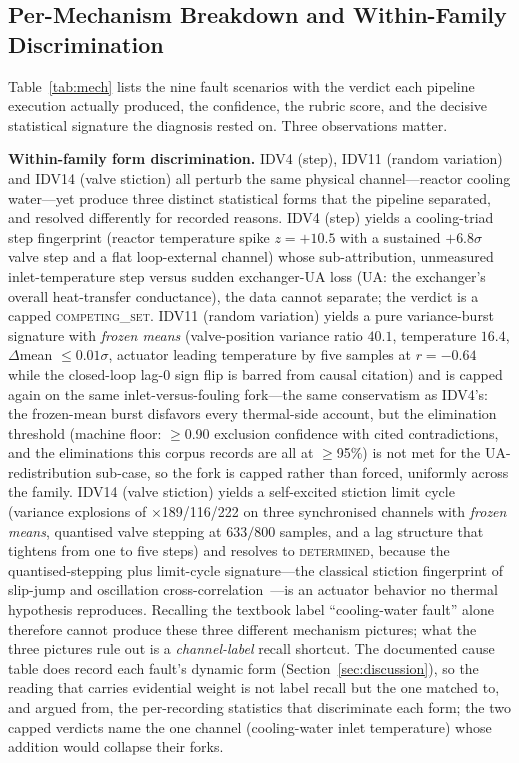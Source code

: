 \documentclass[preprint,10pt]{elsarticle}
\begin{document}
\subsection{Per-Mechanism Breakdown and Within-Family Discrimination}
\label{sec:permech}
Table~\ref{tab:mech} lists the nine fault scenarios with the verdict each pipeline execution actually produced, the confidence, the rubric score, and the decisive statistical signature the diagnosis rested on. Three observations matter.

\textbf{Within-family form discrimination.} IDV4 (step), IDV11 (random variation) and IDV14 (valve stiction) all perturb the same physical channel---reactor cooling water---yet produce three distinct statistical forms that the pipeline separated, and resolved differently for recorded reasons. IDV4 (step) yields a cooling-triad step fingerprint (reactor temperature spike $z{=}{+}10.5$ with a sustained $+6.8\sigma$ valve step and a flat loop-external channel) whose sub-attribution, unmeasured inlet-temperature step versus sudden exchanger-UA loss (UA: the exchanger's overall heat-transfer conductance), the data cannot separate; the verdict is a capped \mbox{\textsc{competing\_set}}. IDV11 (random variation) yields a pure variance-burst signature with \emph{frozen means} (valve-position variance ratio $40.1$, temperature $16.4$, $\Delta$mean $\le 0.01\sigma$, actuator leading temperature by five samples at $r{=}{-}0.64$ while the closed-loop lag-0 sign flip is barred from causal citation) and is capped again on the same inlet-versus-fouling fork---the same conservatism as IDV4's: the frozen-mean burst disfavors every thermal-side account, but the elimination threshold (machine floor: $\ge$0.90 exclusion confidence with cited contradictions, and the eliminations this corpus records are all at $\ge$95\%) is not met for the UA-redistribution sub-case, so the fork is capped rather than forced, uniformly across the family. IDV14 (valve stiction) yields a self-excited stiction limit cycle (variance explosions of $\times$189/116/222 on three synchronised channels with \emph{frozen means}, quantised valve stepping at $633/800$ samples, and a lag structure that tightens from one to five steps) and resolves to \mbox{\textsc{determined}}, because the quantised-stepping plus limit-cycle signature---the classical stiction fingerprint of slip-jump and oscillation cross-correlation~\cite{horch1999simple,hagglund1995control,choudhury2008diagnosis}---is an actuator behavior no thermal hypothesis reproduces. Recalling the textbook label ``cooling-water fault'' alone therefore cannot produce these three different mechanism pictures; what the three pictures rule out is a \emph{channel-label} recall shortcut. The documented cause table does record each fault's dynamic form (Section~\ref{sec:discussion}), so the reading that carries evidential weight is not label recall but the one matched to, and argued from, the per-recording statistics that discriminate each form; the two capped verdicts name the one channel (cooling-water inlet temperature) whose addition would collapse their forks.
\end{document}
